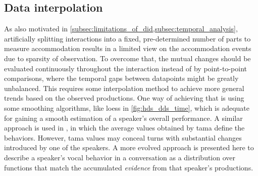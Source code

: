 \begin{description}
%	
\end{description}

\subsection[Data interpolation using kriging]{Data interpolation}
\label{subsec:interploating_data_using_kriging}

As also motivated in \cref{subsec:limitations_of_did,subsec:temporal_analysis}, artificially splitting interactions into a fixed, pre-determined number of parts to measure accommodation results in a limited view on the accommodation events due to sparsity of observation.
To overcome that, the mutual changes should be evaluated continuously throughout the interaction instead of by point-to-point comparisons, where the temporal gaps between datapoints might be greatly unbalanced.
This requires some interpolation method to achieve more general trends based on the observed productions.
One way of achieving that is using some smoothing algorithms, like \ac{loess} in  \cref{fig:hds_dds_time}, which is adequate for gaining a smooth estimation of a speaker's overall performance.
A similar approach is used in \citet{Galvez2020unifiying}, in which the average values obtained by \acl{tama} \citep[\acs{tama};][]{Kousidis2008towards, Kousidis2009monitoring} define the behaviors.
However, \ac{tama} values may conceal turns with substantial changes introduced by one of the speakers.
A more evolved approach is presented here to describe a speaker's vocal behavior in a conversation as a distribution over functions that match the accumulated \textit{evidence} from that speaker's productions.

